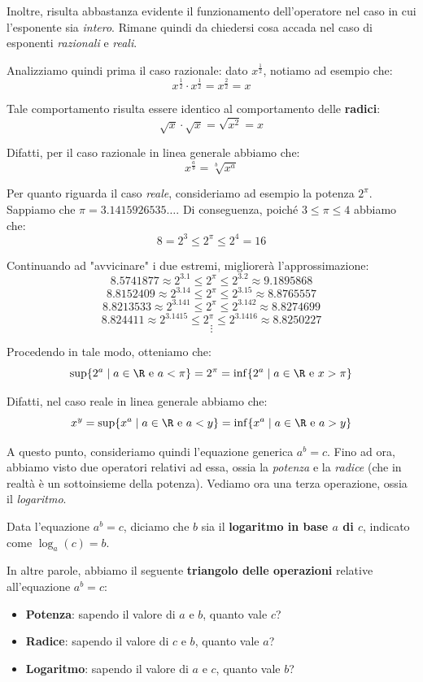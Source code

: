\documentclass[a4paper, 12pt]{report}
\begin{document}
    Inoltre, risulta abbastanza evidente il funzionamento dell'operatore nel caso in cui l'esponente sia \textit{intero}. Rimane quindi da chiedersi cosa accada nel caso di esponenti \textit{razionali} e \textit{reali}.
    
    Analizziamo quindi prima il caso razionale: dato $x^\frac{1}{2}$, notiamo ad esempio che:
    \[x^{\frac{1}{2}} \cdot x^{\frac{1}{2}} = x^{\frac{2}{2}} = x\]

    Tale comportamento risulta essere identico al comportamento delle \textbf{radici}:
    \[\sqrt{x} \cdot \sqrt{x} = \sqrt{x^2} = x\]

    Difatti, per il caso razionale in linea generale abbiamo che:
    \[x^{\frac{a}{b}} = \sqrt[b]{x^a}\]

    Per quanto riguarda il caso \textit{reale}, consideriamo ad esempio la potenza $2^\pi$. Sappiamo che $\pi = 3.1415926535\ldots$. Di conseguenza, poiché $3 \leq \pi \leq 4$ abbiamo che:
    \[8 = 2^3 \leq 2^\pi \leq 2^4 = 16\]

    Continuando ad "avvicinare" i due estremi, migliorerà l'approssimazione:
    \[8.5741877 \approx 2^{3.1} \leq 2^\pi \leq 2^{3.2} \approx 9.1895868 \]
    \[8.8152409 \approx 2^{3.14} \leq 2^\pi \leq 2^{3.15} \approx 8.8765557 \]
    \[8.8213533 \approx 2^{3.141} \leq 2^\pi \leq 2^{3.142} \approx 8.8274699 \]
    \[8.824411 \approx 2^{3.1415} \leq 2^\pi \leq 2^{3.1416} \approx 8.8250227 \]
    \[\vdots\]

    Procedendo in tale modo, otteniamo che:
    \[\sup\{2^a \mid a \in \R \text{ e } a < \pi\} = 2^\pi = \inf\{2^a \mid a \in \R \text{ e } x > \pi\}\]

    Difatti, nel caso reale in linea generale abbiamo che:
    \[x^y = \sup\{x^a \mid a \in \R \text{ e } a < y\} = \inf\{x^a \mid a \in \R \text{ e } a > y\}\]

    A questo punto, consideriamo quindi l'equazione generica $a^b = c$. Fino ad ora, abbiamo visto due operatori relativi ad essa, ossia la \textit{potenza} e la \textit{radice} (che in realtà è un sottoinsieme della potenza). Vediamo ora una terza operazione, ossia il \textit{logaritmo}.

    Data l'equazione $a^b = c$, diciamo che $b$ sia il \textbf{logaritmo in base $a$ di $c$}, indicato come $\log_a(c) = b$.

    In altre parole, abbiamo il seguente \textbf{triangolo delle operazioni} relative all'equazione $a^b = c$:
    \begin{itemize}
        \item \textbf{Potenza}: sapendo il valore di $a$ e $b$, quanto vale $c$? 
        \item \textbf{Radice}: sapendo il valore di $c$ e $b$, quanto vale $a$?
        \item \textbf{Logaritmo}: sapendo il valore di $a$ e $c$, quanto vale $b$? 
    \end{itemize}
    
\end{document}

